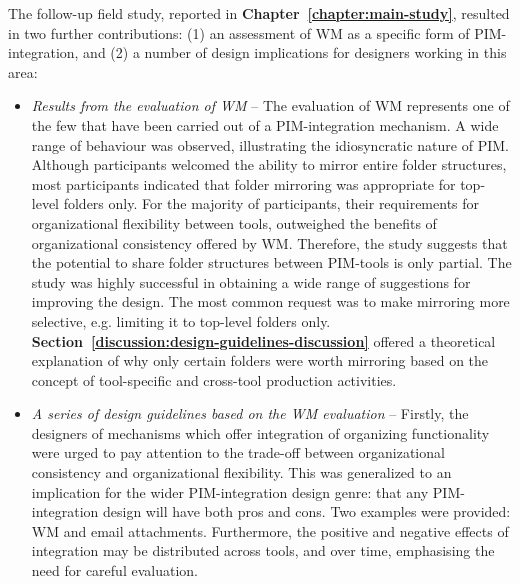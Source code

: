 The follow-up field study, reported in \textbf{Chapter~\ref{chapter:main-study}}, resulted in two further contributions: (1) an assessment of WM as a specific form of PIM-integration, and (2) a number of design implications for designers working in this area:

\begin{itemize}

\item \textit{Results from the evaluation of WM} -- The evaluation of WM represents one of the few that have been carried out of a PIM-integration mechanism.  A wide range of behaviour was observed, illustrating the idiosyncratic nature of PIM.  Although participants welcomed the ability to mirror entire folder structures, most participants indicated that folder mirroring was appropriate for top-level folders only. For the majority of participants, their requirements for organizational flexibility between tools, outweighed the benefits of organizational consistency offered by WM.  Therefore, the study suggests that the potential to share folder structures between PIM-tools is only partial.  
The study was highly successful in obtaining a wide range of suggestions for improving the design. The most common request was to make mirroring more selective, e.g. limiting it to top-level folders only.  \textbf{Section~\ref{discussion:design-guidelines-discussion}} offered a theoretical explanation of why only certain folders were worth mirroring based on the concept of tool-specific and cross-tool production activities.


\item \textit{A series of design guidelines based on the WM evaluation} -- Firstly, the designers of mechanisms which offer integration of organizing functionality were urged to pay attention to the trade-off between organizational consistency and organizational flexibility.  This was generalized to an implication for the wider PIM-integration design genre: that any PIM-integration design will have both pros and cons.  Two examples were provided: WM and email attachments.  Furthermore, the positive and negative effects of integration may be distributed across tools, and over time, emphasising the need for careful evaluation.  %


\end{itemize}

